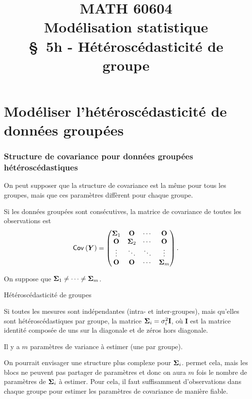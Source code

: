 \documentclass{beamer}
\title[\color{white}{MATH 60604 \S~5h - Hétéroscédasticité de groupe}]{\texorpdfstring{MATH 60604 \\Modélisation statistique \\ \S~5h - Hétéroscédasticité de groupe}{MATH 60604 \\Modélisation statistique \\ \S~5h - Hétéroscédasticité de groupe}}
\author{}
\institute{HEC Montréal\\
Département de sciences de la décision}
\date{}
\begin{document}
\frame{\titlepage}


\section{Modéliser l'hétéroscédasticité de données groupées}
\begin{frame}
\frametitle{Structure de covariance pour données groupées hétéroscédastiques}
\bi 
 \item On peut supposer que la structure de covariance est la même pour tous les groupes, mais que ces paramètres diffèrent pour chaque groupe.
 \item 
Si les données groupées sont consécutives, la matrice de covariance de toutes les observations est 
 \begin{align*}
  {\mathsf{Cov}_{}}\left(\boldsymbol {Y}\right) = \begin{pmatrix}
                 \boldsymbol {\Sigma}_1 & \mathbf{O} & \cdots & \mathbf{O}\\
                  \mathbf{O} &\boldsymbol {\Sigma}_2 & \cdots & \mathbf{O} \\
                  \vdots & \ddots & \ddots & \vdots \\
                   \mathbf{O} & \mathbf{O} & \cdots & \boldsymbol {\Sigma}_m 
                \end{pmatrix}.
\end{align*}
\item On suppose que $\boldsymbol {\Sigma}_1 \neq \cdots \neq \boldsymbol {\Sigma}_m$.
\ei \end{frame}
\begin{frame}{Hétéroscédasticité de groupes}
\bi
\item Si toutes les mesures sont indépendantes (intra- et inter-groupes), mais qu'elles sont hétéroscédastiques par groupe, la matrice $\boldsymbol {\Sigma}_i = \sigma_i^2\mathbf{I}$, où $\mathbf{I}$ est la matrice identité composée de uns sur la diagonale et de zéros hors diagonale. 
\item Il y a $m$ paramètres de variance à estimer (une par groupe).
 
\item On pourrait envisager une structure plus complexe pour $\boldsymbol {\Sigma}_i$. \SASlang{} permet cela, mais les blocs ne peuvent pas partager de paramètres et donc on aura  $m$ fois le nombre de paramètres de $\boldsymbol {\Sigma}_i$ à estimer. Pour cela, il faut suffisamment d'observations dans chaque groupe pour estimer les paramètres de covariance de manière fiable.
\ei
\end{frame}
\end{document}
